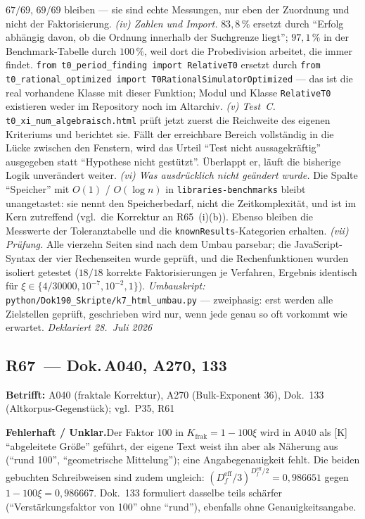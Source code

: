 $67/69$, $69/69$ bleiben --- sie sind echte Messungen, nur eben der
Zuordnung und nicht der Faktorisierung.
\emph{(iv) Zahlen und Import.} $83{,}8\,\%$ ersetzt durch
\enquote{Erfolg abhängig davon, ob die Ordnung innerhalb der Suchgrenze
liegt}; $97{,}1\,\%$ in der Benchmark-Tabelle durch $100\,\%$, weil dort
die Probedivision arbeitet, die immer findet.
\texttt{from t0\_period\_finding import RelativeT0} ersetzt durch
\texttt{from t0\_rational\_optimized import T0RationalSimulatorOptimized}
--- das ist die real vorhandene Klasse mit dieser Funktion; Modul und
Klasse \texttt{RelativeT0} existieren weder im Repository noch im
Altarchiv.
\emph{(v) Test~C.} \texttt{t0\_xi\_num\_algebraisch.html} prüft jetzt
zuerst die Reichweite des eigenen Kriteriums und berichtet sie. Fällt der
erreichbare Bereich vollständig in die Lücke zwischen den Fenstern, wird
das Urteil \enquote{Test nicht aussagekräftig} ausgegeben statt
\enquote{Hypothese nicht gestützt}. Überlappt er, läuft die bisherige
Logik unverändert weiter.
\emph{(vi) Was ausdrücklich nicht geändert wurde.} Die Spalte
\enquote{Speicher} mit $O(1)$ / $O(\log n)$ in
\texttt{libraries-benchmarks} bleibt unangetastet: sie nennt den
Speicherbedarf, nicht die Zeitkomplexität, und ist im Kern zutreffend
(vgl.\ die Korrektur an R65~(i)(b)). Ebenso bleiben die Messwerte der
Toleranztabelle und die \texttt{knownResults}-Kategorien erhalten.
\emph{(vii) Prüfung.} Alle vierzehn Seiten sind nach dem Umbau parsebar;
die JavaScript-Syntax der vier Rechenseiten wurde geprüft, und die
Rechenfunktionen wurden isoliert getestet ($18/18$ korrekte
Faktorisierungen je Verfahren, Ergebnis identisch für
$\xi \in \{4/30000, 10^{-7}, 10^{-2}, 1\}$).
\emph{Umbauskript:}
\texttt{python/\allowbreak Dok190\_\allowbreak Skripte/\allowbreak k7\_\allowbreak html\_\allowbreak umbau.py}
--- zweiphasig: erst werden alle Zielstellen geprüft, geschrieben wird
nur, wenn jede genau so oft vorkommt wie erwartet.
\emph{Deklariert 28.~Juli 2026}

\medskip

\subsection*{R67~--- Dok.\,A040, A270, 133}

\noindent\textbf{Betrifft:} A040 (fraktale Korrektur), A270 (Bulk-Exponent 36),
Dok.~133 (Altkorpus-Gegenstück); vgl.\ P35, R61

\smallskip\noindent\textbf{Fehlerhaft / Unklar.}\quad Der Faktor $100$ in
$K_\text{frak} = 1-100\xi$ wird in A040 als [K] \enquote{abgeleitete Größe}
geführt, der eigene Text weist ihn aber als Näherung aus (\enquote{rund 100},
\enquote{geometrische Mittelung}); eine Angabegenauigkeit fehlt. Die beiden
gebuchten Schreibweisen sind zudem ungleich:
$(D_f^\text{eff}/3)^{D_f^\text{eff}/2} = 0{,}986651$ gegen
$1-100\xi = 0{,}986667$. Dok.~133 formuliert dasselbe teils schärfer
(\enquote{Verstärkungsfaktor von 100} ohne \enquote{rund}), ebenfalls ohne
Genauigkeitsangabe.

